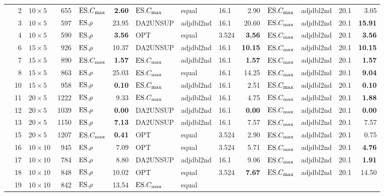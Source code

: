 {\begin{longtable}{l@{}rlr|l@{ }r|l@{ }l@{ }l@{ }r|l@{ }l@{ }l@{ }r}
  &2 & $10\times5$ & 655 & $\text{ES}.{C_{\max}}$ & \textbf{2.60} & $\text{ES}.{C_{\max}}$ & equal & 
  16.1 & 2.90 & $\text{ES}.{C_{\max}}$ & adjdbl2nd & 20.1 & 3.05 \\ 
  &3 & $10\times5$ & 597 & $\text{ES}.{\rho}$ & 23.95 & DA2UNSUP & adjdbl2nd & 
  16.1 & 20.60 & $\text{ES}.{C_{\max}}$ & adjdbl2nd & 20.1 & \textbf{15.91} \\ 
  &4 & $10\times5$ & 590 & $\text{ES}.{\rho}$ & \textbf{3.56} & OPT & equal & 3.524 & 
  \textbf{3.56} & $\text{ES}.{C_{\max}}$ & adjdbl2nd & 20.1 & \textbf{3.56} \\ 
  &6 & $15\times5$ & 926 & $\text{ES}.{\rho}$ & 10.37 & DA2UNSUP & adjdbl2nd & 
  16.1 & \textbf{10.15} & $\text{ES}.{C_{\max}}$ & adjdbl2nd & 20.1 & \textbf{10.15} \\ 
  &7 & $15\times5$ & 890 & $\text{ES}.{C_{\max}}$ & \textbf{1.57} & $\text{ES}.{C_{\max}}$ & adjdbl2nd 
  & 16.1 & \textbf{1.57} & $\text{ES}.{C_{\max}}$ & adjdbl2nd & 20.1 & \textbf{1.57} \\ 
  &8 & $15\times5$ & 863 & $\text{ES}.{\rho}$ & 25.03 & $\text{ES}.{C_{\max}}$ & equal & 16.1 
  & 14.25 & $\text{ES}.{C_{\max}}$ & adjdbl2nd & 20.1 & \textbf{9.04} \\ 
  &10 & $15\times5$ & 958 & $\text{ES}.{\rho}$ & \textbf{0.10} & $\text{ES}.{C_{\max}}$ & adjdbl2nd 
  & 16.1 & 2.51 & $\text{ES}.{C_{\max}}$ & adjdbl2nd & 20.1 & \textbf{0.10} \\ 
  &11 & $20\times5$ & 1222 & $\text{ES}.{\rho}$ & 9.33 & $\text{ES}.{C_{\max}}$ & adjdbl2nd & 
  16.1 & 4.75 & $\text{ES}.{C_{\max}}$ & adjdbl2nd & 20.1 & \textbf{1.88} \\ 
  &12 & $20\times5$ & 1039 & $\text{ES}.{\rho}$ & \textbf{0.00} & DA2UNSUP & adjdbl2nd & 
  16.1 & \textbf{0.00} & $\text{ES}.{C_{\max}}$ & adjdbl2nd & 20.1 & \textbf{0.00} \\ 
  &13 & $20\times5$ & 1150 & $\text{ES}.{\rho}$ & \textbf{7.13} & DA2UNSUP & adjdbl2nd & 
  16.1 & 7.57 & $\text{ES}.{C_{\max}}$ & adjdbl2nd & 20.1 & 7.57 \\ 
  &15 & $20\times5$ & 1207 & $\text{ES}.{C_{\max}}$ & \textbf{0.41} & OPT & equal & 3.524 & 
  2.90 & $\text{ES}.{C_{\max}}$ & adjdbl2nd & 20.1 & 0.75 \\ 
  &16 & $10\times10$ & 945 & $\text{ES}.{\rho}$ & 7.09 & OPT & equal & 3.524 & 
  5.71 & $\text{ES}.{C_{\max}}$ & adjdbl2nd & 20.1 & \textbf{4.76} \\ 
  &17 & $10\times10$ & 784 & $\text{ES}.{\rho}$ & 8.80 & DA2UNSUP & adjdbl2nd & 
  16.1 & 9.06 & $\text{ES}.{C_{\max}}$ & adjdbl2nd & 20.1 & \textbf{1.91} \\ 
  &18 & $10\times10$ & 848 & $\text{ES}.{\rho}$ & 10.02 & OPT & equal & 3.524 & 
  \textbf{7.67} & $\text{ES}.{C_{\max}}$ & adjdbl2nd & 20.1 & 14.50 \\ 
  &19 & $10\times10$ & 842 & $\text{ES}.{\rho}$ & 13.54 & $\text{ES}.{C_{\max}}$ & equal & 

\end{longtable}}
